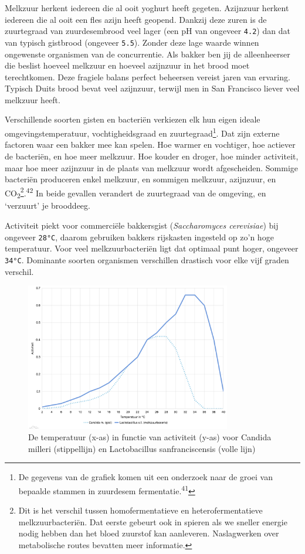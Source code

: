 \documentclass[
  11pt,
  dutch,
]{memoir}
\begin{document}
Melkzuur herkent iedereen die al ooit yoghurt heeft gegeten. Azijnzuur
herkent iedereen die al ooit een fles azijn heeft geopend. Dankzij deze
zuren is de zuurtegraad van zuurdesembrood veel lager (een pH van
ongeveer \texttt{4.2}) dan dat van typisch gistbrood (ongeveer
\texttt{5.5}). Zonder deze lage waarde winnen ongewenste organismen van
de concurrentie. Als bakker ben jij de alleenheerser die beslist hoeveel
melkzuur en hoeveel azijnzuur in het brood moet terechtkomen. Deze
fragiele balans perfect beheersen vereist jaren van ervaring. Typisch
Duits brood bevat veel azijnzuur, terwijl men in San Francisco liever
veel melkzuur heeft.

Verschillende soorten gisten en bacteriën verkiezen elk hun eigen ideale
omgevingstemperatuur, vochtigheidsgraad en zuurtegraad\footnote{De
  gegevens van de grafiek komen uit een onderzoek naar de groei van
  bepaalde stammen in zuurdesem fermentatie.\textsuperscript{41}}. Dat
zijn externe factoren waar een bakker mee kan spelen. Hoe warmer en
vochtiger, hoe actiever de bacteriën, en hoe meer melkzuur. Hoe kouder
en droger, hoe minder activiteit, maar hoe meer azijnzuur in de plaats
van melkzuur wordt afgescheiden. Sommige bacteriën produceren enkel
melkzuur, en sommigen melkzuur, azijnzuur, en
CO\textsubscript{2}\footnote{Dit is het verschil tussen
  homofermentatieve en heterofermentatieve melkzuurbacteriën. Dat eerste
  gebeurt ook in spieren als we sneller energie nodig hebben dan het
  bloed zuurstof kan aanleveren. Naslagwerken over metabolische routes
  bevatten meer informatie.}.\textsuperscript{42} In beide gevallen
verandert de zuurtegraad van de omgeving, en `verzuurt' je brooddeeg.

Activiteit piekt voor commerciële bakkersgist (\emph{Saccharomyces
cerevisiae}) bij ongeveer \texttt{28°C}, daarom gebruiken bakkers
rijskasten ingesteld op zo'n hoge temperatuur. Voor veel
melkzuurbacteriën ligt dat optimaal punt hoger, ongeveer \texttt{34°C}.
Dominante soorten organismen verschillen drastisch voor elke vijf graden
verschil.

\begin{figure}
    \centering
    \includegraphics[width=0.8\textwidth,height=\textheight]{img/activity_vs_temp.png}
    \caption[De temperatuur in functie van activiteit van organismen.]{De temperatuur (x-as) in functie van activiteit (y-as) voor Candida milleri (stippellijn) en Lactobacillus sanfranciscensis (volle lijn)}
\end{figure}
\end{document}
